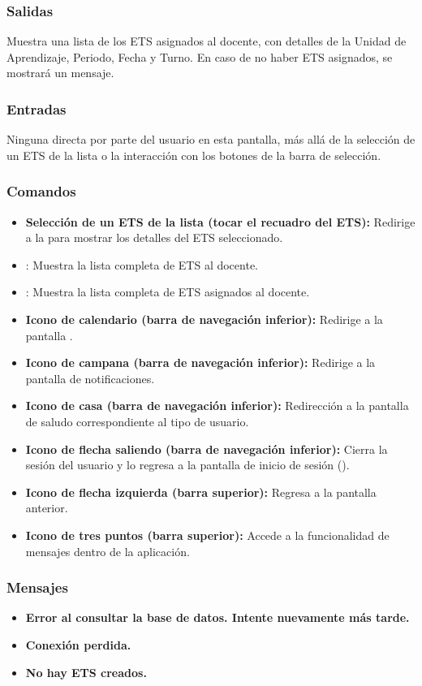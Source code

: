 \subsubsection{Salidas}
Muestra una lista de los ETS asignados al docente, con detalles de la Unidad de Aprendizaje, Periodo, Fecha y Turno. En caso de no haber ETS asignados, se mostrará un mensaje.

\subsubsection{Entradas}
Ninguna directa por parte del usuario en esta pantalla, más allá de la selección de un ETS de la lista o la interacción con los botones de la barra de selección.

\subsubsection{Comandos}
\begin{itemize}
	\item \textbf{Selección de un ETS de la lista (tocar el recuadro del ETS):} Redirige a la  para mostrar los detalles del ETS seleccionado.
	\item {}: Muestra la lista completa de ETS al docente.
	\item {}:  Muestra la lista completa de ETS asignados al docente.
	\item \textbf{Icono de calendario (barra de navegación inferior):} Redirige a la pantalla .
	\item \textbf{Icono de campana (barra de navegación inferior):} Redirige a la pantalla de notificaciones.
	\item \textbf{Icono de casa (barra de navegación inferior):} Redirección a la pantalla de saludo correspondiente al tipo de usuario.
	\item \textbf{Icono de flecha saliendo (barra de navegación inferior):} Cierra la sesión del usuario y lo regresa a la pantalla de inicio de sesión ().
	\item \textbf{Icono de flecha izquierda (barra superior):} Regresa a la pantalla anterior.
	\item \textbf{Icono de tres puntos (barra superior):} Accede a la funcionalidad de mensajes dentro de la aplicación.
\end{itemize}

\subsubsection{Mensajes}
\begin{itemize}
	\item \textbf{Error al consultar la base de datos. Intente nuevamente más tarde.}
	\item \textbf{Conexión perdida.}
	\item \textbf{No hay ETS creados.}
\end{itemize}

